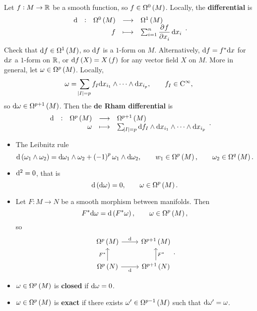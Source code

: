 Let $ f : M \to \mathbb{R} $ be a smooth function, so $ f \in \Omega^0\br{M} $. Locally, the \textbf{differential} is
$$ \function[\d]{\Omega^0\br{M}}{\Omega^1\br{M}}{f}{\sum_{i = 1}^n \dpd{f}{x_i} \d x_i}. $$
Check that $ \d f \in \Omega^1\br{M} $, so $ \mathrm{d} f $ is a $ 1 $-form on $ M $. Alternatively, $ \mathrm{d} f = f^*\mathrm{d} x $ for $ \mathrm{d} x $ a $ 1 $-form on $ \mathbb{R} $, or $ \d f\br{X} = X\br{f} $ for any vector field $ X $ on $ M $. More in general, let $ \omega \in \Omega^p\br{M} $. Locally,
$$ \omega = \sum_{\abs{I} = p} f_I \mathrm{d} x_{i_1} \wedge \dots \wedge \mathrm{d} x_{i_p}, \qquad f_I \in \mathrm{C}^\infty, $$
so $ \d\omega \in \Omega^{p + 1}\br{M} $. Then the \textbf{de Rham differential} is
$$ \function[\d]{\Omega^p\br{M}}{\Omega^{p + 1}\br{M}}{\omega}{\sum_{\abs{I} = p} \d f_I \wedge \d x_{i_1} \wedge \dots \wedge \d x_{i_p}}. $$

\pagebreak

\begin{proposition}
\label{prop:1.16}
\hfill
\begin{itemize}
\item The Leibnitz rule
$$ \d\br{\omega_1 \wedge \omega_2} = \d\omega_1 \wedge \omega_2 + \br{-1}^p\omega_1 \wedge \d\omega_2, \qquad w_1 \in \Omega^p\br{M}, \qquad \omega_2 \in \Omega^q\br{M}. $$
\item $ \mathrm{d}^2 = 0 $, that is
$$ \d\br{\d\omega} = 0, \qquad \omega \in \Omega^p\br{M}. $$
\item Let $ F : M \to N $ be a smooth morphism between manifolds. Then
$$ F^*\d\omega = \d\br{F^*\omega}, \qquad \omega \in \Omega^p\br{M}, $$
so
$$
\begin{tikzcd}
\Omega^p\br{M} \arrow{r}{\d} & \Omega^{p + 1}\br{M} \\
\Omega^p\br{N} \arrow{u}{F^*} \arrow[swap]{r}{\d} & \Omega^{p + 1}\br{N} \arrow[swap]{u}{F^*}
\end{tikzcd}.
$$
\end{itemize}
\end{proposition}


\begin{definition}
\hfill
\begin{itemize}
\item $ \omega \in \Omega^p\br{M} $ is \textbf{closed} if $ \mathrm{d}\omega = 0 $.
\item $ \omega \in \Omega^p\br{M} $ is \textbf{exact} if there exists $ \omega' \in \Omega^{p - 1}\br{M} $ such that $ \mathrm{d}\omega' = \omega $.
\end{itemize}
\end{definition}

